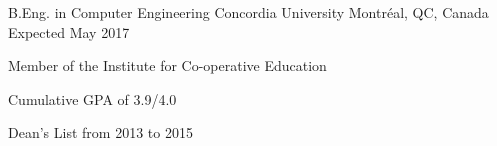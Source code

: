 

\begin{cventries}

  \cventry
    {B.Eng. in Computer Engineering} %
    {Concordia University} %
    {Montréal, QC, Canada} %
    {Expected May 2017} %
    {
      \begin{cvitems} %
        \item {Member of the Institute for Co-operative Education}
        \item {Cumulative GPA of 3.9/4.0}
        \item {Dean's List from 2013 to 2015}
      \end{cvitems}
    }

\end{cventries}
